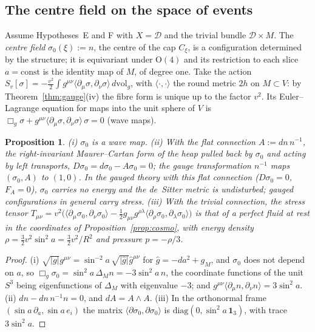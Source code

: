 \documentclass[aps,pra,onecolumn,superscriptaddress,nofootinbib,10pt]{revtex4-2}
\newtheorem{proposition}[theorem]{Proposition}
\theoremstyle{definition}
\theoremstyle{remark}
\newcommand{\cD}{\mathcal{D}}
\newcommand{\ip}[2]{\langle #1,#2\rangle}
\newcommand{\OO}{\mathrm{O}}
\begin{document}
\subsection{The centre field on the space of events}\label{sec:centre}
Assume Hypotheses~E and F with $X=\cD$ and the trivial bundle $\cD\times M$.  The \emph{centre field}
$\sigma_0(\xi):=n$, the centre of the cap $C_\xi$, is a configuration determined by the structure; it is
equivariant under $\OO(4)$ and its restriction to each slice $a=\mathrm{const}$ is the identity map of $M$,
of degree one.  Take the action
$S_v[\sigma]=-\tfrac{v^2}2\int g^{\mu\nu}\ip{\partial_\mu\sigma}{\partial_\nu\sigma}\,d\mathrm{vol}_g$, with
$\ip{\cdot}{\cdot}$ the round metric $2h$ on $M\subset V$: by Theorem~\ref{thm:gauge}(iv) the fibre form is
unique up to the factor $v^2$.  Its Euler--Lagrange equation for maps into the unit sphere of $V$ is
$\Box_g\sigma+g^{\mu\nu}\ip{\partial_\mu\sigma}{\partial_\nu\sigma}\,\sigma=0$ (wave maps).

\begin{proposition}\label{prop:centre}
(i) $\sigma_0$ is a wave map.
(ii) With the flat connection $A:=dn\,n^{-1}$, the right-invariant Maurer--Cartan form of the heap
pulled back by $\sigma_0$ and acting by left transports, $D\sigma_0=d\sigma_0-A\sigma_0=0$; the gauge
transformation $n^{-1}$ maps $(\sigma_0,A)$ to $(1,0)$.  In the gauged theory with this flat connection
($D\sigma_0=0$, $F_A=0$), $\sigma_0$ carries no energy and the de~Sitter metric is undisturbed; gauged
configurations in general carry stress.
(iii) With the trivial connection, the stress tensor
$T_{\mu\nu}=v^2\bigl(\ip{\partial_\mu\sigma_0}{\partial_\nu\sigma_0}-\tfrac12g_{\mu\nu}g^{\rho\lambda}
\ip{\partial_\rho\sigma_0}{\partial_\lambda\sigma_0}\bigr)$ is that of a perfect fluid at rest in the
coordinates of Proposition~\ref{prop:cosmo}, with energy density $\rho=\tfrac32v^2\sin^2a=\tfrac32v^2/R^2$
and pressure $p=-\rho/3$.
\end{proposition}
\begin{proof}
(i) $\sqrt{\lvert g\rvert}g^{\mu\nu}=\sin^{-2}a\,\sqrt{\lvert\hat g\rvert}\hat g^{\mu\nu}$ for
$\hat g=-da^2+g_M$, and $\sigma_0$ does not depend on $a$, so $\Box_g\sigma_0=\sin^2a\,\Delta_M n=-3\sin^2a\,n$,
the coordinate functions of the unit $S^3$ being eigenfunctions of $\Delta_M$ with eigenvalue $-3$; and
$g^{\mu\nu}\ip{\partial_\mu n}{\partial_\nu n}=3\sin^2a$.
(ii) $dn-dn\,n^{-1}n=0$, and $dA=A\wedge A$.
(iii) In the orthonormal frame $(\sin a\,\partial_a,\sin a\,e_i)$ the matrix $\ip{\partial\sigma_0}{\partial\sigma_0}$ is
$\mathrm{diag}(0,\sin^2a\,\mathbf1_3)$, with trace $3\sin^2a$.
\end{proof}
\end{document}
